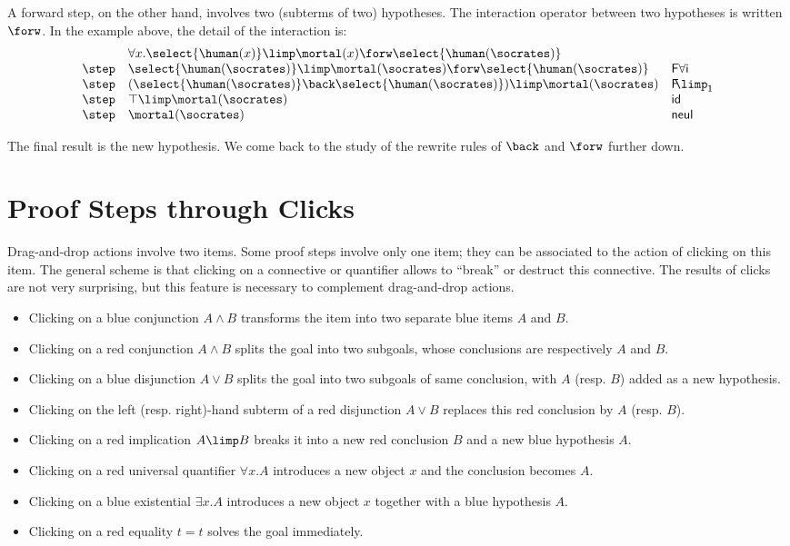 A forward step, on the other hand, involves two (subterms of two)
hypotheses. The interaction operator between two hypotheses is written
$\forw$. In the example above, the detail of the interaction is:
$$
  \begin{array}{lll}
    &  \forall x .\select{\human(x)}\limp\mortal(x) \forw \select{\human(\socrates)}&\\
    \step & \select{\human(\socrates)}\limp\mortal(\socrates) \forw \select{\human(\socrates)}& \mathsf{F \forall i}\\
    \step & (\select{\human(\socrates)}\back \select{\human(\socrates)} )\limp\mortal(\socrates) &\mathsf{F\!\!\limp_1}\\
    \step & \top \limp\mortal(\socrates) &\mathsf{id}\\
    \step & \mortal(\socrates) & \mathsf{neul}\\
  \end{array}
$$

The final result is the new hypothesis. We come back to the study of the rewrite
rules of ${\back}$ and ${\forw}$ further down.


\section{Proof Steps through Clicks}
Drag-and-drop actions involve two items. Some proof steps involve only
one item; they can be associated to the action of clicking on this
item. The general scheme is that clicking on a connective or quantifier
allows to ``break'' or destruct this connective. The results of clicks
are not very surprising, but this feature is necessary to complement
drag-and-drop actions.
\begin{itemize}
\item Clicking on a blue conjunction $A\land B$ transforms the
    item into two separate blue items $A$ and $B$.
\item Clicking on a red conjunction $A\land B$ splits the goal into
    two subgoals, whose conclusions are respectively $A$ and $B$.
\item Clicking on a blue disjunction $A\lor B$ splits the goal into two subgoals
    of same conclusion, with $A$ (resp. $B$) added as a new hypothesis.
\item Clicking on the left (resp. right)-hand subterm of a red
      disjunction $A\lor B$ replaces this red conclusion by $A$
      (resp. $B$).
\item Clicking on a red implication $A\limp B$ breaks it into a
      new red conclusion $B$ and a new blue hypothesis $A$.
\item Clicking on a red universal quantifier $\forall x.A$ introduces
  a new object $x$ and the conclusion becomes $A$.
\item Clicking on a blue existential $\exists x.A$ introduces a new
  object $x$ together with a blue hypothesis $A$.
\item Clicking on a red equality $t = t$ solves the goal immediately.
\end{itemize}

